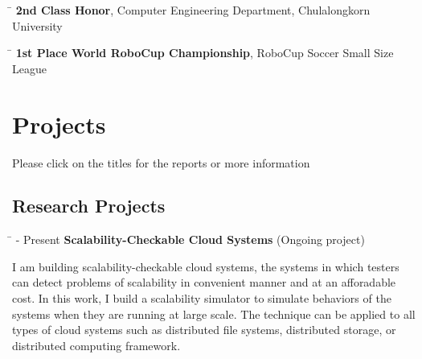 \documentclass[10pt]{article} %
\begin{document}
\begin{tabbing}
\hspace{2.5cm} \=  \> \textbf{2nd Class Honor}, Computer Engineering Department, Chulalongkorn University
\end{tabbing}

\begin{tabbing}
\hspace{2.5cm} \=  \> \textbf{1st Place World RoboCup Championship}, RoboCup Soccer Small Size League
\end{tabbing}



\section{Projects}
\vspace{-4mm}
{\footnotesize Please click on the titles for the reports or more information}

\subsection{Research Projects}

\begin{tabbing}
\hspace{2.5cm} \=  - Present \>\+ \textbf{Scalability-Checkable Cloud Systems} (Ongoing project) \\
\begin{minipage}{\smallertextwidth}
I am building scalability-checkable cloud systems, the systems in which testers can detect
problems of scalability in convenient manner and at an afforadable cost. In
this work, I build a scalability simulator to simulate behaviors of the systems when they
are running at large scale. The technique can be applied to all types of cloud systems such
as distributed file systems, distributed storage, or distributed computing framework.
\end{minipage}
\end{tabbing}
\end{document}
